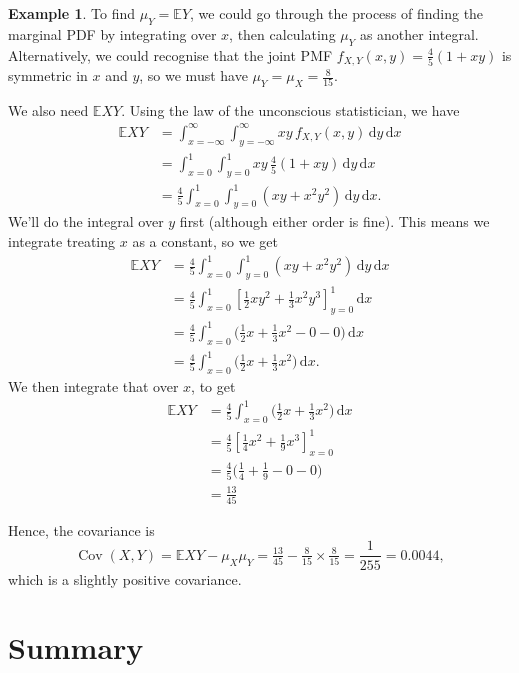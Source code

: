 \documentclass[
  a4paper,
]{book}
\theoremstyle{definition}
\theoremstyle{definition}
\newtheorem{example}{Example}[chapter]
\theoremstyle{definition}
\theoremstyle{definition}
\theoremstyle{remark}
\begin{document}
\begin{example}
To find \(\mu_Y = \mathbb EY\), we could go through the process of finding the marginal PDF by integrating over \(x\), then calculating \(\mu_Y\) as another integral. Alternatively, we could recognise that the joint PMF \(f_{X,Y}(x,y) = \frac45 (1+xy)\) is symmetric in \(x\) and \(y\), so we must have \(\mu_Y = \mu_X = \frac{8}{15}\).

We also need \(\mathbb EXY\). Using the law of the unconscious statistician, we have
\begin{align*}
\mathbb EXY &= \int_{x = -\infty}^{\infty} \int_{y = -\infty}^{\infty} xy\, f_{X,Y}(x,y)\, \mathrm dy\, \mathrm dx \\
  &= \int_{x = 0}^{1} \int_{y = 0}^{1} xy \, \tfrac45 (1+xy) \, \mathrm dy\, \mathrm dx \\
  &= \tfrac45 \int_{x = 0}^{1} \int_{y = 0}^{1} (xy + x^2y^2)\, \mathrm dy\, \mathrm dx .
\end{align*}
We'll do the integral over \(y\) first (although either order is fine). This means we integrate treating \(x\) as a constant, so we get
\begin{align*}
\mathbb EXY &= \tfrac45 \int_{x = 0}^{1} \int_{y = 0}^{1} (xy + x^2y^2)\, \mathrm dy\, \mathrm dx \\
  &= \tfrac45 \int_{x = 0}^{1} \left[ \tfrac12 xy^2 + \tfrac13 x^2y^3 \right]_{y=0}^1 \, \mathrm dx \\
  &= \tfrac45 \int_{x = 0}^{1} \big( \tfrac12x + \tfrac13 x^2 - 0 - 0\big) \, \mathrm dx \\
  &= \tfrac45 \int_{x = 0}^{1} \big( \tfrac12x + \tfrac13 x^2\big) \, \mathrm dx .
\end{align*}
We then integrate that over \(x\), to get
\begin{align*}
\mathbb EXY &= \tfrac45 \int_{x = 0}^{1} \big( \tfrac12x + \tfrac13 x^2\big) \, \mathrm dx \\
  &= \tfrac45 \left[ \tfrac14 x^2 + \tfrac19 x^3 \right]_{x=0}^1 \\
  &= \tfrac45 \big(\tfrac14 + \tfrac19 - 0 - 0 \big) \\
  &= \tfrac{13}{45}
\end{align*}

Hence, the covariance is
\[ \operatorname{Cov}(X, Y) = \mathbb EXY - \mu_X \mu_Y = \tfrac{13}{45} - \tfrac{8}{15} \times \tfrac{8}{15} = \frac{1}{255} = 0.0044 , \]
which is a slightly positive covariance.
\end{example}

\hypertarget{summary-L17}{%
\section*{Summary}\label{summary-L17}}
\end{document}
